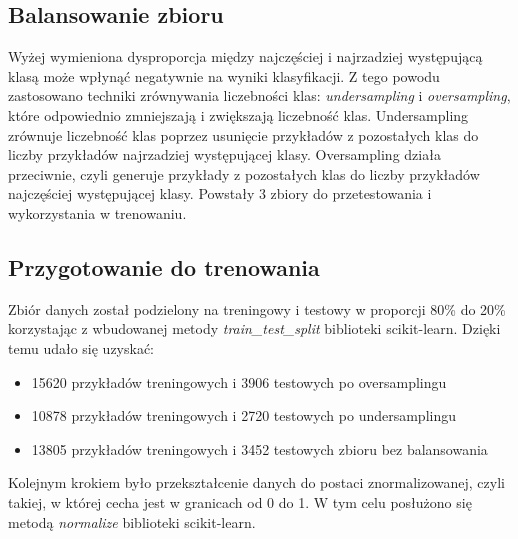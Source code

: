 \subsection{Balansowanie zbioru}\label{subsec:balansowanie_zbioru}
Wyżej wymieniona dysproporcja między najczęściej i najrzadziej występującą klasą może wpłynąć negatywnie na wyniki klasyfikacji.
Z tego powodu zastosowano techniki zrównywania liczebności klas: \textit{undersampling} i \textit{oversampling},
które odpowiednio zmniejszają i zwiększają liczebność klas. Undersampling zrównuje liczebność klas
poprzez usunięcie przykładów z pozostałych klas do liczby przykładów najrzadziej występującej klasy.
Oversampling działa przeciwnie, czyli generuje przykłady z pozostałych klas do liczby przykładów najczęściej występującej klasy.
Powstały 3 zbiory do przetestowania i wykorzystania w trenowaniu.
\subsection{Przygotowanie do trenowania}\label{subsec:przygotowanie_do_trenowania}
Zbiór danych został podzielony na treningowy i testowy w proporcji 80\% do 20\%
korzystając z wbudowanej metody \textit{train\_test\_split} biblioteki scikit-learn. Dzięki temu udało się uzyskać:
\begin{itemize}
    \item 15620 przykładów treningowych i 3906 testowych po oversamplingu
    \item 10878 przykładów treningowych i 2720 testowych po undersamplingu
    \item 13805 przykładów treningowych i 3452 testowych zbioru bez balansowania
\end{itemize}
Kolejnym krokiem było przekształcenie danych do postaci znormalizowanej, czyli takiej, w której cecha jest w granicach od 0 do 1.
W tym celu posłużono się metodą \textit{normalize} biblioteki scikit-learn.